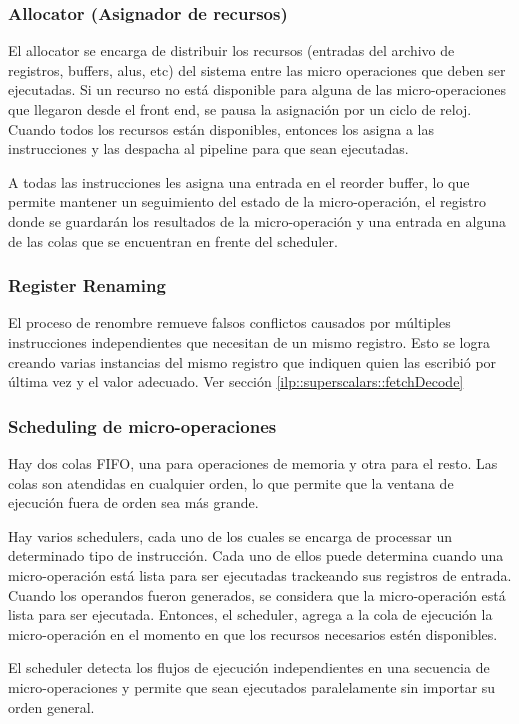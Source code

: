 \subsubsection*{Allocator (Asignador de recursos)}
El allocator se encarga de distribuir los recursos (entradas del archivo de registros, buffers, alus, etc) del sistema entre las micro operaciones que deben ser ejecutadas. Si un recurso no está disponible para alguna de las micro-operaciones que llegaron desde el front end, se pausa la asignación por un ciclo de reloj. Cuando todos los recursos están disponibles, entonces los asigna a las instrucciones y las despacha al pipeline para que sean ejecutadas.

A todas las instrucciones les asigna una entrada en el reorder buffer, lo que permite mantener un seguimiento del estado de la micro-operación, el registro donde se guardarán los resultados de la micro-operación y una entrada en alguna de las colas que se encuentran en frente del scheduler.

\subsubsection*{Register Renaming}
El proceso de renombre remueve falsos conflictos causados por múltiples instrucciones independientes que necesitan de un mismo registro. Esto se logra creando varias instancias del mismo registro que indiquen quien las escribió por última vez y el valor adecuado. Ver sección \ref{ilp::superscalars::fetchDecode} 

\subsubsection*{Scheduling de micro-operaciones}
Hay dos colas FIFO, una para operaciones de memoria y otra para el resto. Las colas son atendidas en cualquier orden, lo que permite que la ventana de ejecución fuera de orden sea más grande.

Hay varios schedulers, cada uno de los cuales se encarga de processar un determinado tipo de instrucción. Cada uno de ellos puede determina cuando una micro-operación está lista para ser ejecutadas trackeando sus registros de entrada. Cuando los operandos fueron generados, se considera que la micro-operación está lista para ser ejecutada. Entonces, el scheduler, agrega a la cola de ejecución la micro-operación en el momento en que los recursos necesarios estén disponibles.

El scheduler detecta los flujos de ejecución independientes en una secuencia de micro-operaciones y permite que sean ejecutados paralelamente sin importar su orden general.

